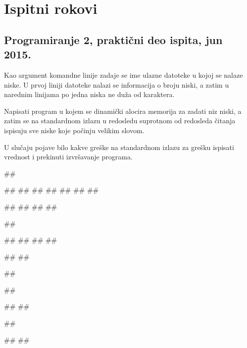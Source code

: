 \chapter{Ispitni rokovi}

\section{Programiranje 2, praktični deo ispita, jun 2015.}

\begin{Exercise}[label=901]
Kao argument komandne linije zadaje se ime ulazne datoteke u kojoj se nalaze niske. U prvoj liniji datoteke nalazi se informacija o broju niski, a zatim u narednim linijama po jedna niska ne duža od  karaktera.
  
Napisati program u kojem se dinamički alocira memorija za zadati niz niski, a zatim se na standardnom izlazu u redosledu suprotnom od redosleda čitanja ispisuju sve niske koje počinju velikim slovom. 

U slučaju pojave bilo kakve greške na standardnom izlazu za grešku ispisati vrednost  i prekinuti izvršavanje programa.

\begin{miditest}
\begin{test}{1}
##

##
##
##
##
##
##
##
  
#\naslovIzlaz#
##
##
##
\end{test}
\end{miditest}
\begin{minitest}
\begin{test}{2}
##

##
##
##
##

#\naslovIzlaz#
#\izlaz{}#
\end{test}
\end{minitest}


\begin{miditest}
\begin{test}{3}
##

##

#\naslovIzlaz#
##
\end{test}
\end{miditest}
\begin{miditest}
\begin{test}{4}
##

#\naslovIzlazZaGresku#
##
\end{test}
\end{miditest}

\end{Exercise}
\begin{Answer}[ref=901]
\end{Answer}


